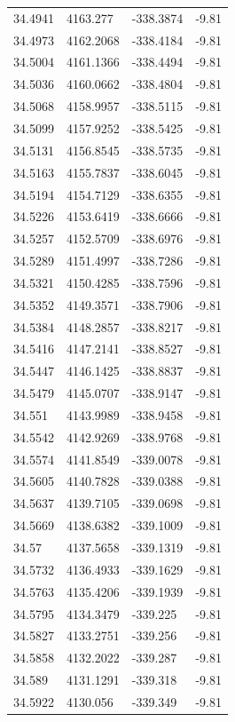 \begin{table}[H]
\begin{tabular}{llll}
34.4941 & 4163.277 & -338.3874 & -9.81 \\
34.4973 & 4162.2068 & -338.4184 & -9.81 \\
34.5004 & 4161.1366 & -338.4494 & -9.81 \\
34.5036 & 4160.0662 & -338.4804 & -9.81 \\
34.5068 & 4158.9957 & -338.5115 & -9.81 \\
34.5099 & 4157.9252 & -338.5425 & -9.81 \\
34.5131 & 4156.8545 & -338.5735 & -9.81 \\
34.5163 & 4155.7837 & -338.6045 & -9.81 \\
34.5194 & 4154.7129 & -338.6355 & -9.81 \\
34.5226 & 4153.6419 & -338.6666 & -9.81 \\
34.5257 & 4152.5709 & -338.6976 & -9.81 \\
34.5289 & 4151.4997 & -338.7286 & -9.81 \\
34.5321 & 4150.4285 & -338.7596 & -9.81 \\
34.5352 & 4149.3571 & -338.7906 & -9.81 \\
34.5384 & 4148.2857 & -338.8217 & -9.81 \\
34.5416 & 4147.2141 & -338.8527 & -9.81 \\
34.5447 & 4146.1425 & -338.8837 & -9.81 \\
34.5479 & 4145.0707 & -338.9147 & -9.81 \\
34.551 & 4143.9989 & -338.9458 & -9.81 \\
34.5542 & 4142.9269 & -338.9768 & -9.81 \\
34.5574 & 4141.8549 & -339.0078 & -9.81 \\
34.5605 & 4140.7828 & -339.0388 & -9.81 \\
34.5637 & 4139.7105 & -339.0698 & -9.81 \\
34.5669 & 4138.6382 & -339.1009 & -9.81 \\
34.57 & 4137.5658 & -339.1319 & -9.81 \\
34.5732 & 4136.4933 & -339.1629 & -9.81 \\
34.5763 & 4135.4206 & -339.1939 & -9.81 \\
34.5795 & 4134.3479 & -339.225 & -9.81 \\
34.5827 & 4133.2751 & -339.256 & -9.81 \\
34.5858 & 4132.2022 & -339.287 & -9.81 \\
34.589 & 4131.1291 & -339.318 & -9.81 \\
34.5922 & 4130.056 & -339.349 & -9.81 \\

\end{tabular}
\end{table}
